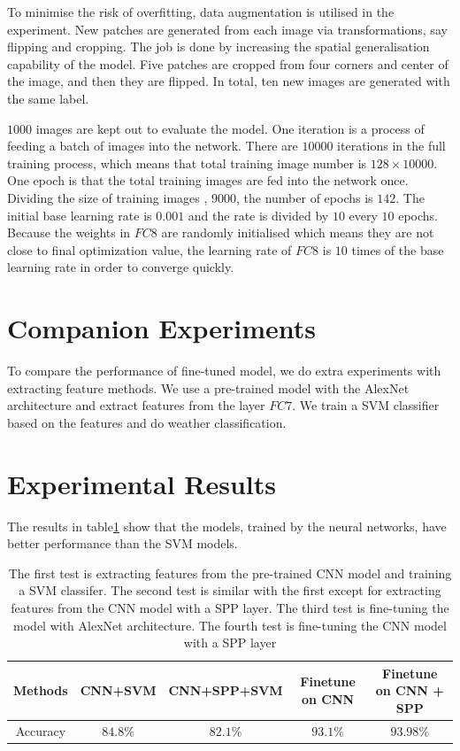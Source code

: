 To minimise the risk of overfitting, data augmentation is utilised in the experiment. New patches are generated from each image via transformations, say flipping and cropping. The job is done by increasing the spatial generalisation capability of the model. Five patches are cropped from four corners and center of the image, and then they are flipped. In total, ten new images are generated with the same label.

$1000$ images are kept out to evaluate the model. One iteration is a process of feeding a batch of images into the network. There are $10000$ iterations in the full training process, which means that total training image number is $128\times10000$. One epoch is that the total training images are fed into the network once. Dividing the size of training images , $9000$, the number of epochs is $142$. The initial base learning rate is $0.001$ and the rate is divided by $10$ every $10$ epochs. Because the weights in $FC8$ are randomly initialised which means they are not close to final optimization value, the learning rate of $FC8$ is $10$ times of the base learning rate in order to converge quickly.

\section{Companion Experiments}

To compare the performance of fine-tuned model, we do extra experiments with extracting feature methods. We use a pre-trained model with the AlexNet architecture and extract features from the layer $FC7$. We train a SVM classifier based on the features and do weather classification.

\section{Experimental Results}

The results in table\ref{ExpRes} show that the models, trained by the neural networks, have better performance than the SVM models. 

\begin{table}[h]
\begin{center}
    \begin{tabular}{| c | c | c | c | c |}
    \hline
    Methods & CNN+SVM & CNN+SPP+SVM & Finetune on CNN & Finetune on CNN + SPP  \\ \hline
    Accuracy & $84.8\%$ & $82.1\%$ & $93.1\%$ & $93.98\%$ \\ \hline
    \end{tabular}
    \caption{The first test is extracting features from the pre-trained CNN model and training a SVM classifer. The second test is similar with the first except for extracting features from the CNN model with a SPP layer. The third test is fine-tuning the model with AlexNet architecture. The fourth test is fine-tuning the CNN model with a SPP layer}
    \label{ExpRes}
\end{center}
\end{table}

